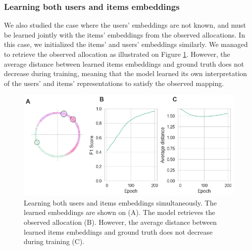 \subsubsection*{Learning both users and items embeddings}

We also studied the case where the users' embeddings are not known, and must be learned jointly with the items' embeddings from the observed allocations. In this case, we initialized the items' and users' embeddings similarly. We managed to retrieve the observed allocation as illustrated on Figure \ref{fig:experiment_learn_users_embeddings}. However, the average distance between learned items embeddings and ground truth does not decrease during training, meaning that the model learned its own interpretation of the users' and items' representations to satisfy the observed mapping.

\begin{figure}[h]
    \centering
    \includegraphics[width=.9\columnwidth]{images/simca/experiment_learn_both_embeddings.png}
    \caption{
        Learning both users and items embeddings simultaneously. The learned embeddings are shown on (A). The model retrieves the observed allocation (B). However, the average distance between learned items embeddings and ground truth does not decrease during training (C).
    }
    \label{fig:experiment_learn_users_embeddings}
\end{figure}

